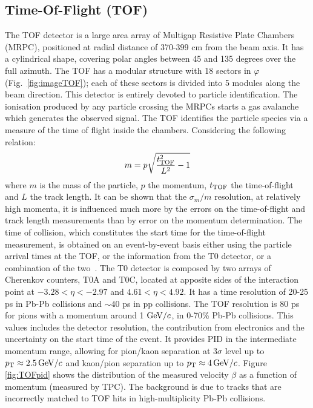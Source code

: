 \subsection{Time-Of-Flight (TOF)}
\label{sec:TOF}
The TOF detector is a large area array of Multigap Resistive Plate Chambers (MRPC), 
positioned at radial distance of 370-399 cm from the beam axis. It has a cylindrical 
shape, covering polar angles between 45 and 135 degrees over the full azimuth. 
The TOF has a modular structure with 18 sectors in $\varphi$ (Fig.~\ref{fig:imageTOF}); each 
of these sectors is divided into 5 modules along the beam direction. 
This detector is entirely devoted to particle identification. 
The ionisation produced by any particle crossing the MRPCs starts a gas avalanche 
which generates the observed signal. The TOF identifies the particle species via a measure of the time of flight 
inside the chambers. Considering the following relation:
\[
m = p \sqrt{\frac{t^2_{\rm TOF}}{L^2}-1}
\]
where $m$ is the mass of the particle, $p$ the momentum, $t_{\rm TOF}$ the time-of-flight and 
$L$  the track length. It can be shown that the $\sigma_m/m$ resolution, at relatively high
 momenta, it is influenced much more by the errors on the time-of-flight and track length 
 measurements than by error on the momentum determination.
 The time of collision, which constitutes the start time for the time-of-flight measurement,
 is obtained on an event-by-event basis either using the particle arrival times
 at the TOF, or the information from the T0 detector, or a combination of the two~\cite{Adam:2016ilk}. 
 The T0 detector is composed by two arrays of
Cherenkov counters, T0A and T0C, located at apposite sides of the interaction point at 
$-3.28 < \eta < - 2.97$ and $4.61 < \eta < 4.92$. It has a time resolution of 20-25 ps
 in Pb-Pb collisions and $\sim 40$ ps in pp collisions.
 The TOF resolution is 80 ps for pions with a momentum around 1 $\mathrm{GeV}/c$, in 0-70\% Pb-Pb collisions.
This values includes the detector resolution, the contribution from electronics and the uncertainty
on the start time of the event.
It provides PID in the intermediate momentum range, allowing for pion/kaon separation at 3$\sigma$ level
up to $p_{\rm T} \approx 2.5 \,\mathrm{GeV}/c$  and kaon/pion separation up to $p_{\rm T} \approx 4 \,\mathrm{GeV}/c$.
Figure \ref{fig:TOFpid} shows the distribution of the measured velocity $\beta$ as a function of momentum (measured by TPC). 
The background is due to tracks that are incorrectly matched to TOF hits in high-multiplicity Pb-Pb collisions.

